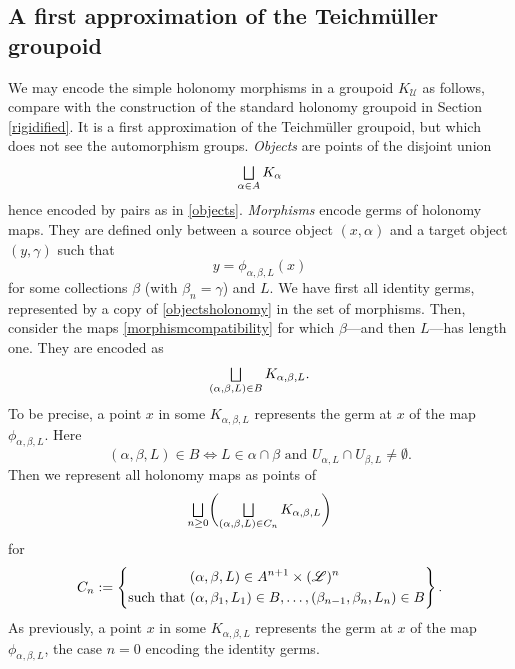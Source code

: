 \documentclass[JEP,XML,SOM,Unicode]{cedram}
\let\mathcal\mathscr
\let\oldbigsqcup\bigsqcup
\renewcommand{\bigsqcup}{\mathop{\textstyle\oldbigsqcup}\displaylimits}
\theoremstyle{plain}
\theoremstyle{definition}
\theoremstyle{remark}
\numberwithin{equation}{section}
\let\uniondisjointe\bigsqcup
\begin{document}
\subsection{A first approximation of the Teichmüller groupoid}
\label{firstapp}
We may encode the simple holonomy morphisms in a groupoid $K_\mathcal U$ as follows, compare with the construction of the standard holonomy groupoid in Section \ref{rigidified}. It is a first approximation of the Teichmüller groupoid, but which does not see the automorphism groups. \emph{Objects} are points of the disjoint union
\begin{equation}
\label{objectsholonomy}
\uniondisjointe_{\alpha\in A} K_{\alpha}
\end{equation}
hence encoded by pairs as in \eqref{objects}. \emph{Morphisms} encode germs of holonomy maps. They are defined only between a source object $(x,\alpha)$ and a target object $(y,\gamma)$ such that
\begin{equation}
\label{morphismcompatibility}
y=\phi_{\alpha,\beta, L}(x)
\end{equation}
for some collections $\beta$ (with $\beta_n=\gamma$) and $L$. We have first all identity germs, represented by a copy of \eqref{objectsholonomy} in the set of morphisms. Then, consider the maps \eqref{morphismcompatibility} for which $\beta$---and then $L$---has length one. They are encoded as
\begin{equation}
\label{morphismholonomy1}
\uniondisjointe_{(\alpha,\beta, L) \in B} K_{\alpha,\beta, L}.
\end{equation}
To be precise, a point $x$ in some $K_{\alpha,\beta, L}$ represents the germ at $x$ of the map $\phi_{\alpha,\beta, L}$. Here
\begin{equation}
\label{Bdef}
(\alpha,\beta,L)\in B\iff L\in\alpha\cap\beta\text{ and }U_{\alpha,L}\cap U_{\beta,L}\not=\emptyset.
\end{equation}
Then we represent all holonomy maps as
points of
\begin{equation}
\label{morphismholonomy2}
\uniondisjointe_{n\geq 0}\biggl (\uniondisjointe_{(\alpha,\beta, L) \in C_{n}} K_{\alpha,\beta, L} \biggr )
\end{equation}
for
\begin{equation}
\label{Cn}
C_n:=\left\{
\begin{aligned}
&(\alpha,\beta, L)\in A^{n+1}\times (\mathcal L)^{n}\cr
\text{such that }&(\alpha,\beta_1,L_1)\in B,\hdots, (\beta_{n-1},\beta_n,L_n)\in B
\end{aligned}\hspace*{-10pt}
\right\}.
\end{equation}
As previously, a point $x$ in some $K_{\alpha,\beta, L}$ represents the germ at $x$ of the map $\phi_{\alpha,\beta, L}$, the case $n=0$ encoding the identity
germs.
\end{document}
